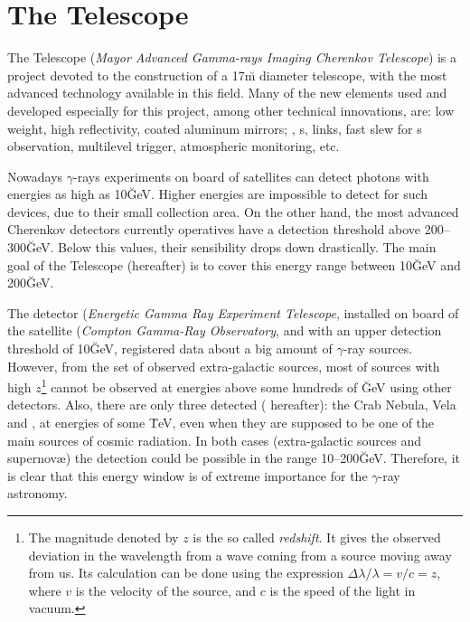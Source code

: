 
\chapter{The \MAGIC Telescope}
\label{chapter:magic}

The  Telescope (\emph{Mayor Advanced Gamma-rays Imaging
  Cherenkov Telescope}) is a project devoted to the construction of a
17\u{m} diameter \Cherenkov telescope, with the most advanced
technology available in this field. Many of the new elements used and
developed especially for this project, among other technical
innovations, are: low weight, high reflectivity, coated aluminum
mirrors; , s, 
links, fast slew for s observation, multilevel trigger,
atmospheric monitoring, etc.

Nowadays $\gamma$-rays experiments on board of satellites can detect
photons with energies as high as 10\u{GeV}. Higher energies are
impossible to detect for such devices, due to their small collection
area. On the other hand, the most advanced Cherenkov detectors
currently operatives have a detection threshold above 200--300\u{GeV}.
Below this values, their sensibility drops down drastically. The main
goal of the \MAGIC Telescope (\MAGIC hereafter) is to cover this
energy range between 10\u{GeV} and 200\u{GeV}.
%
\energygapfig

The detector  (\emph{Energetic Gamma Ray Experiment
  Telescope}, installed on board of the satellite 
(\emph{Compton Gamma-Ray Observatory}, and with an upper detection
threshold of 10\u{GeV}, registered data about a big amount of
$\gamma$-ray sources. However, from the set of observed extra-galactic
sources, most of sources with high %
%
$z$\footnote{The magnitude denoted by $z$ is the so called
  \emph{redshift}.  It gives the observed deviation in the wavelength
  from a wave coming from a source moving away from us. Its
  calculation can be done using the expression
  $\Delta\lambda/\lambda=v/c=z$, where $v$ is the velocity of the
  source, and $c$ is the speed of
  the light in vacuum.}%
%
cannot be observed at energies above some hundreds of \u{GeV} using
other detectors. Also, there are only three detected
\emph{} ( hereafter): the Crab
Nebula, Vela and , at energies of some \u{TeV}, even when
they are supposed to be one of the main sources of cosmic
radiation. In both cases (extra-galactic sources and supernov\ae) the
detection could be possible in the range 10--200\u{GeV}.  Therefore,
it is clear that this energy window is of extreme importance for the
$\gamma$-ray astronomy.

